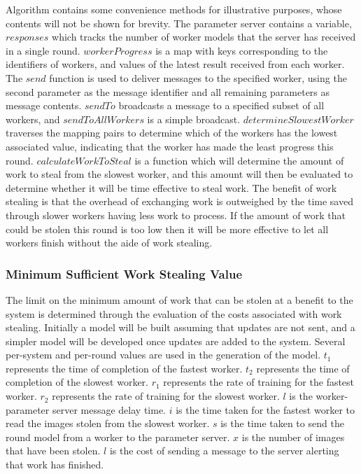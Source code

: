 \documentclass[12pt]{article}
\begin{document}
Algorithm contains some convenience methods for illustrative purposes, whose contents will not be shown for brevity. The parameter server contains a variable, $responses$ which tracks the number of worker models that the server has received in a single round. $workerProgress$ is a map with keys corresponding to the identifiers of workers, and values of the latest result received from each worker.
\newline
The $send$ function is used to deliver messages to the specified worker, using the second parameter as the message identifier and all remaining parameters as message contents. $sendTo$ broadcasts a message to a specified subset of all workers, and $sendToAllWorkers$ is a simple broadcast.
\newline
$determineSlowestWorker$ traverses the mapping pairs to determine which of the workers has the lowest associated value, indicating that the worker has made the least progress this round. $calculateWorkToSteal$
is a function which will determine the amount of work to steal from the slowest worker, and this amount will then be evaluated to determine whether it will be time effective to steal work. The benefit of work stealing is that the overhead of exchanging work is outweighed by the time saved through slower workers having less work to process. If the amount of work that could be stolen this round is too low then it will be more effective to let all workers finish without the aide of work stealing.

\subsubsection{Minimum Sufficient Work Stealing Value}
The limit on the minimum amount of work that can be stolen at a benefit to the system is determined through the evaluation of the costs associated with work stealing. Initially a model will be built assuming that updates are not sent, and a simpler model will be developed once updates are added to the system.
\newline
\newline
Several per-system and per-round values are used in the generation of the model.
$t_1$ represents the time of completion of the fastest worker.
$t_2$ represents the time of completion of the slowest worker.
$r_1$ represents the rate of training for the fastest worker.
$r_2$ represents the rate of training for the slowest worker.
$l$ is the worker-parameter server message delay time.
$i$ is the time taken for the fastest worker to read the images stolen from the slowest worker.
$s$ is the time taken to send the round model from a worker to the parameter server.
$x$ is the number of images that have been stolen.
$l$ is the cost of sending a message to the server alerting that work has finished.
\end{document}
